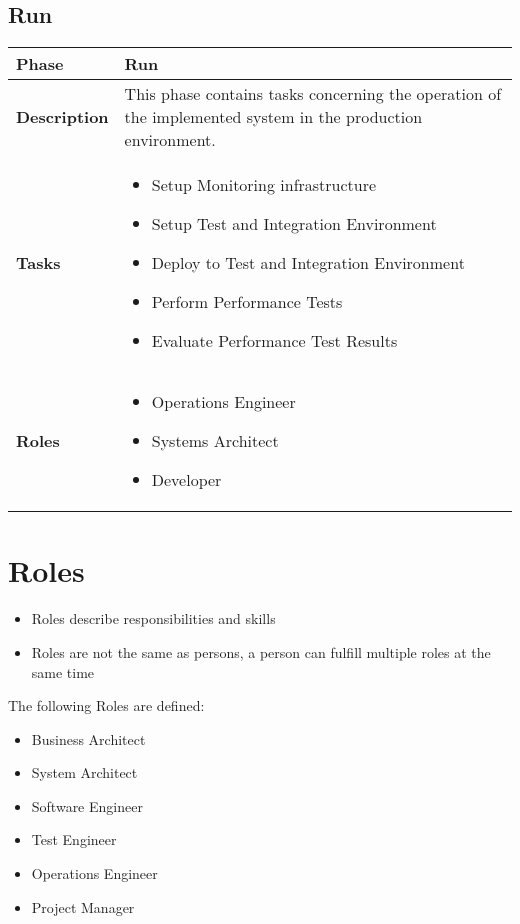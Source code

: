 \subsection{Run}
\begin{minipage}{\textwidth}
\label{table:ch6_View_Run}
\begin{tabular}
	{|m{2cm}|m{10cm}|} \hline \bfseries Phase & Run\\
	\hline \bfseries Description & This phase contains tasks concerning the operation of the implemented system in the production environment. \\
	\hline \bfseries Tasks & 
	\begin{itemize}
		\item Setup Monitoring infrastructure
		\item Setup Test and Integration Environment
		\item Deploy to Test and Integration Environment
		\item Perform Performance Tests
		\item Evaluate Performance Test Results
	\end{itemize}
	\\
	\hline \bfseries Roles &
	\begin{itemize}
		\item Operations Engineer
		\item Systems Architect
		\item Developer
	\end{itemize}
	\\
	\hline 
\end{tabular}
\end{minipage}

\section{Roles} 

\begin{itemize}
	\item Roles describe responsibilities and skills
	\item Roles are not the same as persons, a person can fulfill multiple roles at the same time
\end{itemize}

The following Roles are defined:
\begin{itemize}
	\item Business Architect
	\item System Architect 
	\item Software Engineer
	\item Test Engineer
	\item Operations Engineer
	\item Project Manager
\end{itemize}

